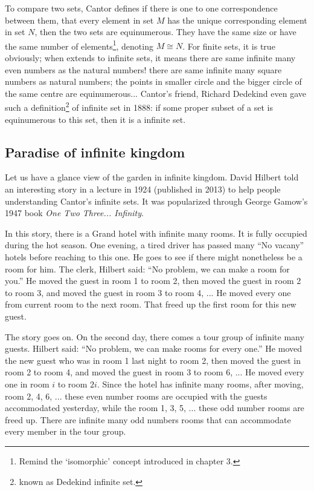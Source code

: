 \documentclass{article}
\begin{document}
To compare two sets, Cantor defines if there is one to one correspondence between them, that every element in set $M$ has the unique corresponding element in set $N$, then the two sets are equinumerous. They have the same size or have the same number of elements\footnote{Remind the `isomorphic' concept introduced in chapter 3.}, denoting $M \cong N$. For finite sets, it is true obviously; when extends to infinite sets, it means there are same infinite many even numbers as the natural numbers! there are same infinite many square numbers as natural numbers; the points in smaller circle and the bigger circle of the same centre are equinumerous... Cantor's friend, Richard Dedekind even gave such a definition\footnote{known as Dedekind infinite set.} of infinite set in 1888: if some proper subset of a set is equinumerous to this set, then it is a infinite set.


\subsection{Paradise of infinite kingdom}

Let us have a glance view of the garden in infinite kingdom. David Hilbert told an interesting story in a lecture in 1924 (published in 2013) to help people understanding Cantor's infinite sets. It was popularized through George Gamow's 1947 book {\em One Two Three... Infinity}.

In this story, there is a Grand hotel with infinite many rooms. It is fully occupied during the hot season. One evening, a tired driver has passed many ``No vacany'' hotels before reaching to this one. He goes to see if there might nonetheless be a room for him. The clerk, Hilbert said: ``No problem, we can make a room for you.'' He moved the guest in room 1 to room 2, then moved the guest in room 2 to room 3, and moved the guest in room 3 to room 4, ... He moved every one from current room to the next room. That freed up the first room for this new guest.

The story goes on. On the second day, there comes a tour group of infinite many guests. Hilbert said: ``No problem, we can make rooms for every one.'' He moved the new guest who was in room 1 last night to room 2, then moved the guest in room 2 to room 4, and moved the guest in room 3 to room 6, ... He moved every one in room $i$ to room $2i$. Since the hotel has infinite many rooms, after moving, room 2, 4, 6, ... these even number rooms are occupied with the guests accommodated yesterday, while the room 1, 3, 5, ... these odd number rooms are freed up. There are infinite many odd numbers rooms that can accommodate every member in the tour group.
\end{document}

